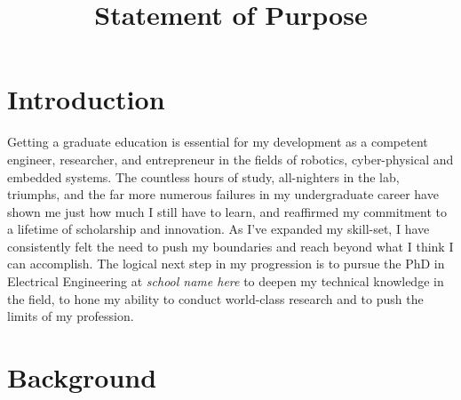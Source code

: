 \documentclass[journal, draftcls]{IEEEtran}
\begin{document}
%
\title{Statement of Purpose}
\author{
}
\maketitle
\section{Introduction}

Getting a graduate education is essential for my development as a competent engineer, researcher, and entrepreneur in the fields of robotics, cyber-physical and embedded systems. The countless hours of study, all-nighters in the lab, triumphs, and the far more numerous failures in my undergraduate career have shown me just how much I still have to learn, and reaffirmed my commitment to a lifetime of scholarship and innovation. As I've expanded my skill-set, I have consistently felt the need to push my  boundaries and reach beyond what I think I can accomplish. The logical next step in my progression is to pursue the PhD in Electrical Engineering at \textit{{school name here}} to deepen my technical knowledge in the field, to hone my ability to conduct world-class research and to push the limits of my profession. 

\section{Background}
\end{document}
